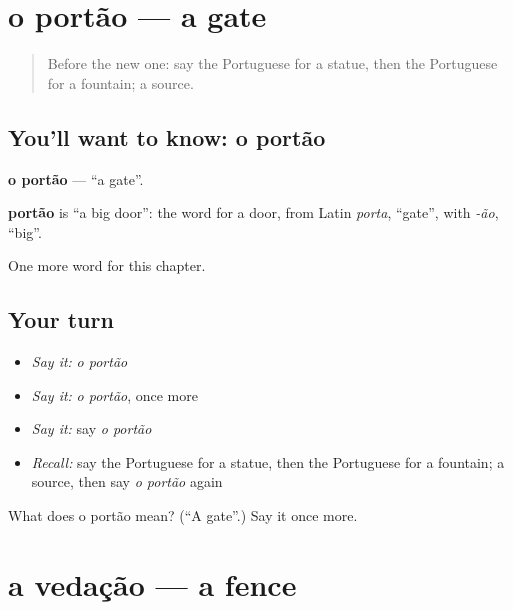 \section[o portão]{o portão — a gate}

\label{lesson:PT-C194-portao}



\begin{quote}
Before the new one: say the Portuguese for a statue, then the Portuguese for a fountain; a source.
\end{quote}

\subsection*{You'll want to know: o portão}
\textbf{o portão} — \textquotedblleft{}a gate\textquotedblright{}.

\begin{cousinweb}
\textbf{portão} is \textquotedblleft{}a big door\textquotedblright{}: the word for a door, from Latin \emph{porta}, \textquotedblleft{}gate\textquotedblright{}, with \emph{-ão}, \textquotedblleft{}big\textquotedblright{}.
\end{cousinweb}

\begin{grammarlens}[title={What you've built}]
One more word for this chapter.
\end{grammarlens}

\subsection*{Your turn}
\begin{itemize}
\raggedright
  \item \emph{Say it:} \emph{o portão}
  \item \emph{Say it:} \emph{o portão}, once more
  \item \emph{Say it:} say \emph{o portão}
  \item \emph{Recall:} say the Portuguese for a statue, then the Portuguese for a fountain; a source, then say \emph{o portão} again
\end{itemize}

\begin{tcolorbox}[breakable,colback=teal!4,colframe=teal!35!black,title={Before you move on}]
What does o portão mean? (\textquotedblleft{}A gate\textquotedblright{}.) Say it once more.
\end{tcolorbox}
\section[a vedação]{a vedação — a fence}

